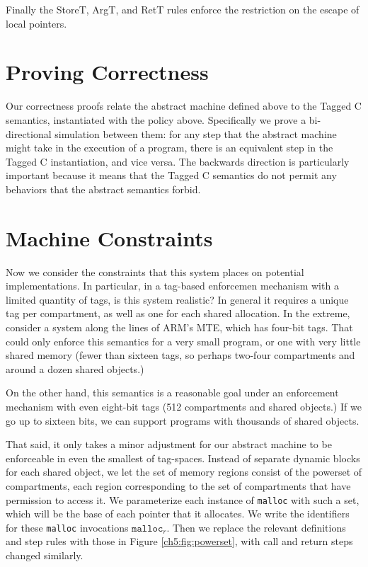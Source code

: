Finally the StoreT, ArgT, and RetT rules enforce the restriction on the escape of local pointers.
  
\section{Proving Correctness}

Our correctness proofs relate the abstract machine defined above to the Tagged C semantics,
instantiated with the policy above. Specifically we prove a bi-directional simulation between
them: for any step that the abstract machine might take in the execution of a program, there
is an equivalent step in the Tagged C instantiation, and vice versa. The backwards direction
is particularly important because it means that the Tagged C semantics do not permit any
behaviors that the abstract semantics forbid.

\section{Machine Constraints}

Now we consider the constraints that this system places on potential implementations.
In particular, in a tag-based enforcemen mechanism with a limited quantity of tags,
is this system realistic? In general it requires a unique tag per compartment,
as well as one for each shared allocation. In the extreme, consider a system along
the lines of ARM's MTE, which has four-bit tags. That could only enforce this
semantics for a very small program, or one with very little shared memory
(fewer than sixteen tags, so perhaps two-four compartments and around a dozen shared objects.)

On the other hand, this semantics is a reasonable goal under an enforcement mechanism
with even eight-bit tags (512 compartments and shared objects.) If we go up to sixteen
bits, we can support programs with thousands of shared objects.

That said, it only takes a minor adjustment for our abstract machine to be enforceable in even
the smallest of tag-spaces. Instead of separate dynamic blocks for each shared
object, we let the set of memory regions consist of the powerset of compartments,
each region corresponding to the set of compartments that have permission to access it.
We parameterize each instance of {\tt malloc}
with such a set, which will be the base of each pointer that it allocates. We write
the identifiers for these {\tt malloc} invocations \(\mathtt{malloc}_r\).
Then we replace the relevant definitions and step rules with those in
Figure \ref{ch5:fig:powerset}, with call and return steps changed similarly.

